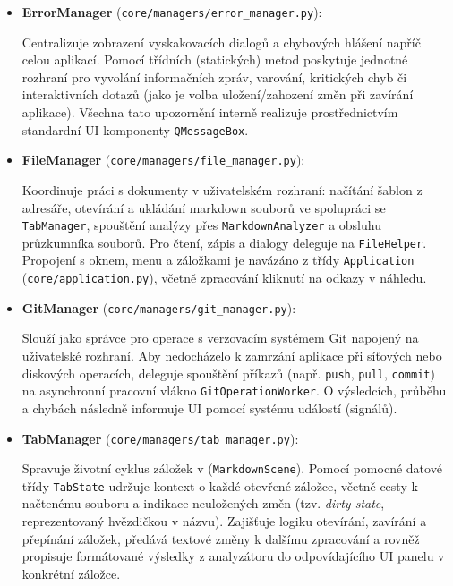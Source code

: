 \documentclass[12pt, a4paper]{article}
\begin{document}
\begin{itemize}
\begin{itemize}
        \item \textbf{ErrorManager} (\texttt{core/managers/error\_manager.py}):

        Centralizuje zobrazení vyskakovacích dialogů a chybových hlášení napříč celou aplikací. 
        Pomocí třídních (statických) metod poskytuje jednotné rozhraní pro vyvolání informačních zpráv, 
        varování, kritických chyb či interaktivních dotazů (jako je volba uložení/zahození změn při zavírání aplikace). 
        Všechna tato upozornění interně realizuje prostřednictvím standardní UI komponenty \texttt{QMessageBox}.

        \item \textbf{FileManager} (\texttt{core/managers/file\_manager.py}):

        Koordinuje práci s dokumenty v uživatelském rozhraní: 
        načítání šablon z adresáře, otevírání a ukládání markdown souborů ve spolupráci se \texttt{TabManager}, 
        spouštění analýzy přes \texttt{MarkdownAnalyzer} a obsluhu průzkumníka souborů. Pro čtení, zápis a 
        dialogy deleguje na \texttt{FileHelper}. Propojení s oknem, menu a záložkami je navázáno z třídy 
        \texttt{Application} (\texttt{core/application.py}), včetně zpracování kliknutí na odkazy v náhledu.

        \item \textbf{GitManager} (\texttt{core/managers/git\_manager.py}):

        Slouží jako správce pro operace s verzovacím systémem Git napojený na uživatelské rozhraní. 
        Aby nedocházelo k zamrzání aplikace při síťových nebo diskových operacích, 
        deleguje spouštění příkazů (např. \texttt{push}, \texttt{pull}, \texttt{commit}) na asynchronní pracovní vlákno 
        \texttt{GitOperationWorker}. O výsledcích, průběhu a chybách následně informuje UI pomocí systému událostí (signálů).

        \item \textbf{TabManager} (\texttt{core/managers/tab\_manager.py}):

        Spravuje životní cyklus záložek v (\texttt{MarkdownScene}). 
        Pomocí pomocné datové třídy \texttt{TabState} udržuje kontext o každé otevřené záložce, včetně cesty 
        k načtenému souboru a indikace neuložených změn (tzv. \textit{dirty state}, reprezentovaný hvězdičkou v názvu). 
        Zajišťuje logiku otevírání, zavírání a přepínání záložek, předává textové změny k dalšímu zpracování a 
        rovněž propisuje formátované výsledky z analyzátoru do odpovídajícího UI panelu v konkrétní záložce.
    \end{itemize}


\end{itemize}
\end{document}
